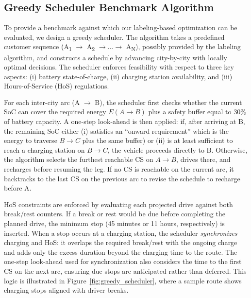 \documentclass[trsc,dblanonrev]{informs4}
\begin{document}
\subsection{Greedy Scheduler Benchmark Algorithm}

To provide a benchmark against which our labeling-based optimization can be evaluated, we design a greedy scheduler. The algorithm takes a predefined customer sequence (A\textsubscript{1} $\rightarrow$ A\textsubscript{2} $\rightarrow \dots \rightarrow$ A\textsubscript{N}), possibly provided by the labeling algorithm, and constructs a schedule by advancing city-by-city with locally optimal decisions. The scheduler enforces feasibility with respect to three key aspects: (i) battery state-of-charge, (ii) charging station availability, and (iii) Hours-of-Service (HoS) regulations.


For each inter-city arc (A $\rightarrow$ B), the scheduler first checks whether the current SoC can cover the required energy $E(A\!\rightarrow\!B)$ plus a safety buffer equal to $30\%$ of battery capacity. A one-step look-ahead is then applied: if, after arriving at B, the remaining SoC either (i) satisfies an “onward requirement” which is the energy to traverse $B\!\rightarrow\!C$ plus the same buffer) or (ii) is at least sufficient to reach a charging station on $B\!\rightarrow\!C$, the vehicle proceeds directly to B. Otherwise, the algorithm selects the furthest reachable CS on $A\!\rightarrow\!B$, drives there, and recharges before resuming the leg. If no CS is reachable on the current arc, it backtracks to the last CS on the previous arc to revise the schedule to recharge before A.

HoS constraints are enforced by evaluating each projected drive against both break/rest counters. If a break or rest would be due before completing the planned drive, the minimum stop (45 minutes or 11 hours, respectively) is inserted. When a stop occurs at a charging station, the scheduler \emph{synchronizes} charging and HoS: it overlaps the required break/rest with the ongoing charge and adds only the excess duration beyond the charging time to the route. The one-step look-ahead used for synchronization also considers the time to the first CS on the next arc, ensuring due stops are anticipated rather than deferred. This logic is illustrated in Figure~\ref{fig:greedy_scheduler}, where a sample route shows charging stops aligned with driver breaks. 
\end{document}
